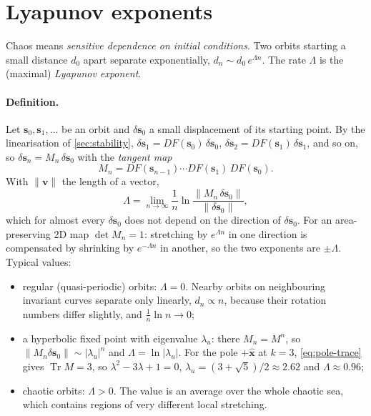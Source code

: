 \documentclass[11pt,a4paper]{article}
\newcommand{\vs}{\bm{s}}
\newcommand{\Tr}{\operatorname{Tr}}
\begin{document}
\section{Lyapunov exponents}\label{sec:lyapunov}

Chaos means \emph{sensitive dependence on initial conditions}. Two orbits starting a small distance $d_0$ apart
separate exponentially, $d_n \sim d_0\, e^{\Lambda n}$. The rate $\Lambda$ is the (maximal) \emph{Lyapunov exponent}.

\paragraph{Definition.} Let $\vs_0, \vs_1, \dots$ be an orbit and $\delta\vs_0$ a small displacement of its starting
point. By the linearisation of \cref{sec:stability}, $\delta\vs_1 = DF(\vs_0)\,\delta\vs_0$, $\delta\vs_2 =
DF(\vs_1)\,\delta\vs_1$, and so on, so $\delta\vs_n = M_n\,\delta\vs_0$ with the \emph{tangent map}
\begin{equation*}
  M_n = DF(\vs_{n-1})\cdots DF(\vs_1)\,DF(\vs_0).
\end{equation*}
With $\|\bm v\|$ the length of a vector,
\begin{equation}\label{eq:lyapunov}
  \Lambda = \lim_{n\to\infty} \frac{1}{n}\ln\frac{\|M_n\,\delta\vs_0\|}{\|\delta\vs_0\|} ,
\end{equation}
which for almost every $\delta\vs_0$ does not depend on the direction of $\delta\vs_0$. For an area-preserving 2D map
$\det M_n = 1$: stretching by $e^{\Lambda n}$ in one direction is compensated by shrinking by $e^{-\Lambda n}$ in
another, so the two exponents are $\pm\Lambda$. Typical values:
\begin{itemize}
  \item regular (quasi-periodic) orbits: $\Lambda = 0$. Nearby orbits on neighbouring invariant curves separate only
  linearly, $d_n \propto n$, because their rotation numbers differ slightly, and $\frac1n\ln n \to 0$;
  \item a hyperbolic fixed point with eigenvalue $\lambda_u$: there $M_n = M^n$, so $\|M_n\delta\vs_0\| \sim
  |\lambda_u|^n$ and $\Lambda = \ln|\lambda_u|$. For the pole $+\hat{\bm x}$ at $k=3$, \eqref{eq:pole-trace} gives
  $\Tr M = 3$, so $\lambda^2 - 3\lambda + 1 = 0$, $\lambda_u = (3+\sqrt5)/2 \approx 2.62$ and $\Lambda \approx 0.96$;
  \item chaotic orbits: $\Lambda > 0$. The value is an average over the whole chaotic sea, which contains regions of
  very different local stretching.
\end{itemize}
\end{document}
